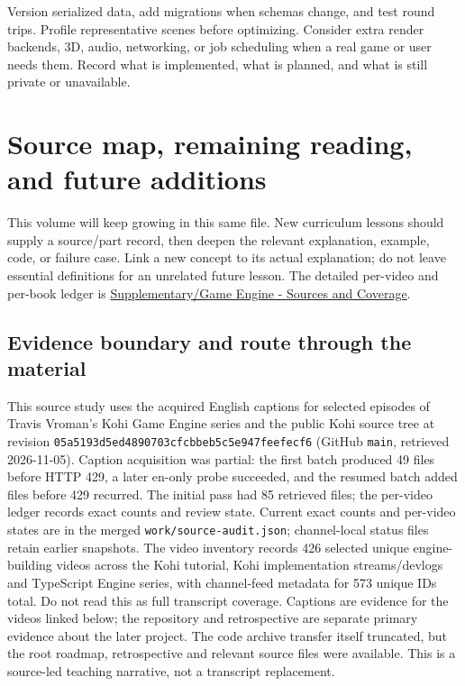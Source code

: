 Version serialized data, add migrations when schemas change, and test round trips. Profile representative scenes before optimizing. Consider extra render backends, 3D, audio, networking, or job scheduling when a real game or user needs them. Record what is implemented, what is planned, and what is still private or unavailable.

\section{Source map, remaining reading, and future additions}\label{06-engine-ii-ch042-source-map-remaining-reading-and-future-additions}

This volume will keep growing in this same file. New curriculum lessons should supply a source/part record, then deepen the relevant explanation, example, code, or failure case. Link a new concept to its actual explanation; do not leave essential definitions for an unrelated future lesson. The detailed per-video and per-book ledger is \hyperref[appendix-877738f6f4d2]{Supplementary/Game Engine - Sources and Coverage}.

\subsection{Evidence boundary and route through the material}\label{06-engine-ii-ch042-evidence-boundary-and-route-through-the-material}

This source study uses the acquired English captions for selected episodes of Travis Vroman's Kohi Game Engine series and the public Kohi source tree at revision \texttt{05a5193d5ed4890703cfcbbeb5c5e947feefecf6} (GitHub \texttt{main}, retrieved 2026-11-05). Caption acquisition was partial: the first batch produced 49 files before HTTP 429, a later en-only probe succeeded, and the resumed batch added files before 429 recurred. The initial pass had 85 retrieved files; the per-video ledger records exact counts and review state. Current exact counts and per-video states are in the merged \texttt{work/source-audit.json}; channel-local status files retain earlier snapshots. The video inventory records 426 selected unique engine-building videos across the Kohi tutorial, Kohi implementation streams/devlogs and TypeScript Engine series, with channel-feed metadata for 573 unique IDs total. Do not read this as full transcript coverage. Captions are evidence for the videos linked below; the repository and retrospective are separate primary evidence about the later project. The code archive transfer itself truncated, but the root roadmap, retrospective and relevant source files were available. This is a source-led teaching narrative, not a transcript replacement.

